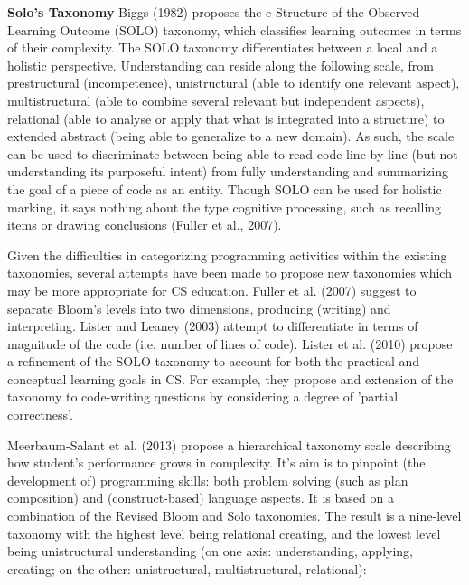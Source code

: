 \textbf{Solo's Taxonomy}\newline
Biggs (1982) proposes the e Structure of the Observed Learning Outcome (SOLO) taxonomy, which classifies learning outcomes in terms of their complexity. The SOLO taxonomy differentiates between a local and a holistic perspective. Understanding can reside along the following scale, from prestructural (incompetence), unistructural (able to identify one relevant aspect), multistructural (able to combine several relevant but independent aspects), relational (able to analyse or apply that what is integrated into a structure) to extended abstract (being able to generalize to a new domain). As such, the scale can be used to discriminate between being able to read code line-by-line (but not understanding its purposeful intent) from fully understanding and summarizing the goal of a piece of code as an entity. Though SOLO can be used for holistic marking, it says nothing about the type cognitive processing, such as recalling items or drawing conclusions (Fuller et al., 2007).


Given the difficulties in categorizing programming activities within the existing taxonomies, several attempts have been made to propose new taxonomies which may be more appropriate for CS education. Fuller et al. (2007) suggest to separate Bloom’s levels into two dimensions, producing (writing) and interpreting. Lister and Leaney (2003) attempt to differentiate in terms of magnitude of the code (i.e. number of lines of code). Lister et al. (2010) propose a refinement of the SOLO taxonomy to account for both the practical and conceptual learning goals in CS. For example, they propose and extension of the taxonomy to code-writing questions by considering a degree of 'partial correctness'.


Meerbaum-Salant et al. (2013) propose a hierarchical taxonomy scale describing how student’s performance grows in complexity. It’s aim is to pinpoint (the development of) programming skills: both problem solving (such as plan composition) and (construct-based) language aspects. It is based on a combination of the Revised Bloom and Solo taxonomies. The result is a nine-level taxonomy with
the highest level being relational creating, and the lowest level being
unistructural understanding (on one axis: understanding, applying, creating; on the other: unistructural, multistructural, relational):



